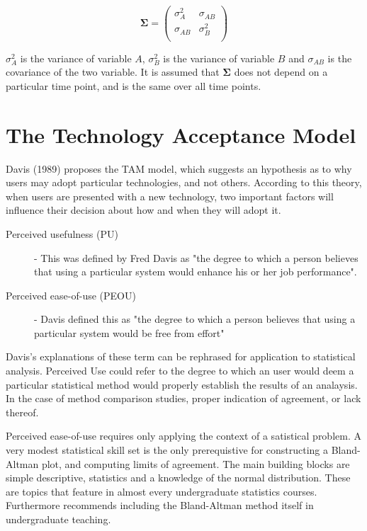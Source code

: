 \documentclass[12pt, a4paper]{report}
\theoremstyle{plain}
\theoremstyle{definition}
\theoremstyle{remark}
\begin{document}
	\[
	\boldsymbol{\Sigma} = \left( \begin{array}{cc}
	\sigma^2_{A} & \sigma_{AB} \\
	\sigma_{AB} & \sigma^2_{B}\\
	\end{array}   \right)
	\]
	
	$\sigma^2_{A}$ is the variance of variable $A$, $\sigma^2_{B}$ is the variance of variable $B$ and $\sigma_{AB}$ is the covariance of the two variable. It is assumed that $\boldsymbol{\Sigma}$ does not depend on a particular time point, and is the same over all time points.
	
	
	
	\section{The Technology Acceptance Model}
	Davis (1989) proposes the TAM model, which suggests an hypothesis as to why users may adopt particular technologies, and not others. 
	According to this theory, when users are presented with a new 
	technology, two important factors will influence their decision about how and when they will adopt it.
	\begin{description}
		\item[Perceived usefulness (PU)] - This was defined by Fred Davis as "the degree to which a person believes that using a particular system would enhance his or her job performance".
		\item[Perceived ease-of-use (PEOU)] - Davis defined this as "the degree to which a person believes that using a particular system would be free from effort" 
	\end{description}
	
	Davis's explanations of these term can be rephrased for application to statistical analysis. 
	Perceived Use could refer to the degree to which an user would deem a particular statistical method would properly establish the results of an analaysis. In the case of method comparison studies, proper indication of agreement, or lack thereof.
	
	
	Perceived ease-of-use requires only applying the context of a satistical problem. A very modest statistical skill set is the only prerequistive for constructing a Bland-Altman plot, and computing limits of agreement. The main building blocks 
	are simple descriptive, statistics and a knowledge of the normal distribution. These are topics that feature in almost every undergraduate statistics courses. Furthermore \citet{kikozak2014including} recommends including the Bland-Altman method itself in undergraduate teaching.
	
\end{document}
